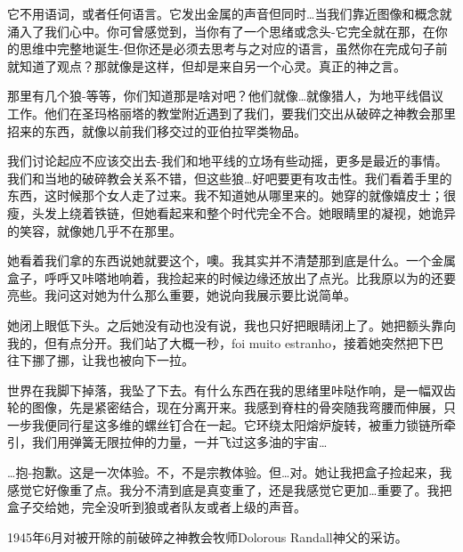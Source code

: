 \begin{scpbox}


它不用语词，或者任何语言。它发出金属的声音但同时…当我们靠近图像和概念就涌入了我们心中。你可曾感觉到，当你有了一个思绪或念头-它完全就在那，在你的思维中完整地诞生-但你还是必须去思考与之对应的语言，虽然你在完成句子前就知道了观点？那就像是这样，但却是来自另一个心灵。真正的神之言。

\end{scpbox}

\begin{scpbox}


那里有几个狼-等等，你们知道那是啥对吧？他们就像…就像猎人，为地平线倡议工作。他们在圣玛格丽塔的教堂附近遇到了我们，要我们交出从破碎之神教会那里招来的东西，就像以前我们移交过的亚伯拉罕类物品。

我们讨论起应不应该交出去-我们和地平线的立场有些动摇，更多是最近的事情。我们和当地的破碎教会关系不错，但这些狼…好吧要更有攻击性。我们看着手里的东西，这时候那个女人走了过来。我不知道她从哪里来的。她穿的就像嬉皮士；很瘦，头发上绕着铁链，但她看起来和整个时代完全不合。她眼睛里的凝视，她诡异的笑容，就像她几乎不在那里。

她看着我们拿的东西说她就要这个，噢。我其实并不清楚那到底是什么。一个金属盒子，呼呼又咔嗒地响着，我捡起来的时候边缘还放出了点光。比我原以为的还要亮些。我问这对她为什么那么重要，她说向我展示要比说简单。

她闭上眼低下头。之后她没有动也没有说，我也只好把眼睛闭上了。她把额头靠向我的，但有点分开。我们站了大概一秒，foi muito estranho，接着她突然把下巴往下挪了挪，让我也被向下一拉。

世界在我脚下掉落，我坠了下去。有什么东西在我的思绪里咔哒作响，是一幅双齿轮的图像，先是紧密结合，现在分离开来。我感到脊柱的骨突随我弯腰而伸展，只一步我便同行星这多维的螺丝钉合在一起。它环绕太阳熔炉旋转，被重力锁链所牵引，我们用弹簧无限拉伸的力量，一并飞过这多油的宇宙…

…抱-抱歉。这是一次体验。不，不是宗教体验。但…对。她让我把盒子捡起来，我感觉它好像重了点。我分不清到底是真变重了，还是我感觉它更加…重要了。我把盒子交给她，完全没听到狼或者队友或者上级的声音。

\end{scpbox}

1945年6月对被开除的前破碎之神教会牧师Dolorous Randall神父的采访。

